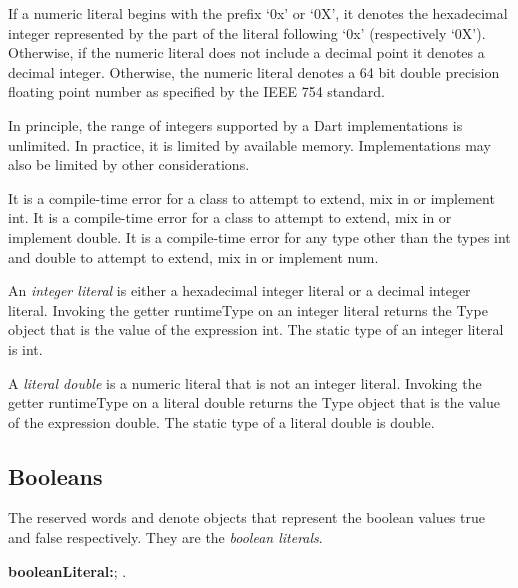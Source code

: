 \documentclass{article}
\newcommand{\code}[1]{{\sf #1}}
\begin{document}
\LMHash{}
If a numeric literal begins with the prefix `0x' or `0X', it denotes the hexadecimal integer represented by the part of the literal following `0x' (respectively `0X'). Otherwise, if the numeric literal does not include a decimal point  it denotes a decimal integer.  Otherwise, the numeric literal  denotes a 64 bit double precision floating point number as specified by the IEEE 754 standard. 

\LMHash{}
In principle, the range of integers supported by a Dart implementations is unlimited. In practice, it is limited by available memory. Implementations may also be limited by other considerations.


\LMHash{}
It is a compile-time error for a class to attempt to extend, mix in or implement \code{int}. It is a compile-time error for a class to attempt to extend, mix in or implement \code{double}. It is a compile-time error for any type other than the types \code{int} and \code{double} to attempt to extend, mix in or implement \code{num}.

\LMHash{}
An {\em integer literal} is either a hexadecimal integer literal or a  decimal integer literal. Invoking the getter \code{runtimeType} on an integer literal returns the \code{Type} object that is the value of the expression \code{int}. The static type of an integer literal is \code{int}. 

\LMHash{}
A {\em literal double} is a numeric literal that is not an integer literal. Invoking the getter \code{runtimeType} on a literal double returns the \code{Type} object that is the value of the expression \code{double}.
The static type of a literal double is \code{double}.
    
\subsection{Booleans}

\LMHash{}
The reserved words \TRUE{} and \FALSE{} denote objects that represent the boolean values true and false respectively. They are the {\em boolean literals}.

\begin{grammar}
{\bf booleanLiteral:}\TRUE{};
        \FALSE{}
    .
\end{grammar}
\end{document}
